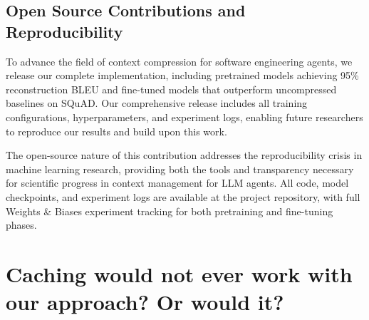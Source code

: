 \subsection{Open Source Contributions and Reproducibility}

To advance the field of context compression for software engineering agents, we release our complete implementation, including pretrained models achieving 95\% reconstruction BLEU and fine-tuned models that outperform uncompressed baselines on SQuAD. Our comprehensive release includes all training configurations, hyperparameters, and experiment logs, enabling future researchers to reproduce our results and build upon this work.

The open-source nature of this contribution addresses the reproducibility crisis in machine learning research, providing both the tools and transparency necessary for scientific progress in context management for LLM agents. All code, model checkpoints, and experiment logs are available at the project repository, with full Weights \& Biases experiment tracking for both pretraining and fine-tuning phases.


\section{Caching would not ever work with our approach? Or would it?}